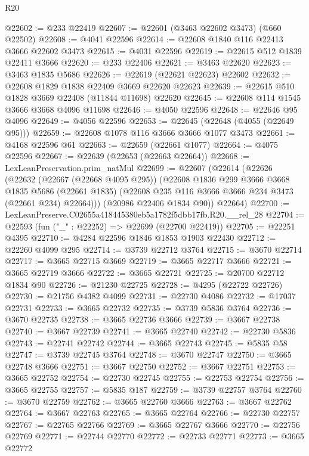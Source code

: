 \begin{lexlean}{R20}
\begin{coremodule}
@22602 := @233 @22419
@22607 := @22601 (@3463 @22602 @3473) (@660 @22502)
@22608 := @4041 @22596
@22614 := @22608 @1840 @116 @22413 @3666 @22602 @3473
@22615 := @4031 @22596
@22619 := @22615 @512 @1839 @22411 @3666
@22620 := @233 @22406
@22621 := @3463 @22620
@22623 := @3463 @1835 @5686
@22626 := @22619 (@22621 @22623) @22602
@22632 := @22608 @1829 @1838 @22409 @3669 @22620 @22623
@22639 := @22615 @510 @1828 @3669 @22408 (@11844 @11698) @22620
@22645 := @22608 @114 @1545 @3666 @3668 @4096 @11698
@22646 := @4050 @22596
@22648 := @22646 @95 @4096
@22649 := @4056 @22596
@22653 := @22645 (@22648 (@4055 (@22649 @95)))
@22659 := @22608 @1078 @116 @3666 @3666 @1077 @3473
@22661 := @4168 @22596 @61
@22663 := @22659 (@22661 @1077)
@22664 := @4075 @22596
@22667 := @22639 (@22653 (@22663 @22664))
@22668 := LexLeanPreservation.prim_natMul
@22699 := @22607
    (@22614
      (@22626
        (@22632
          (@22667 (@22668 @4095 @295))
          (@22608
            @1836
            @299
            @3666
            @3668
            @1835
            @5686
            (@22661 @1835)
            (@22608 @235 @116 @3666 @3666 @234 @3473 (@22661 @234) @22664)))
        (@20986 @22406 @1834 @90))
      @22664)
@22700 := LexLeanPreserve.C02655a418445380eb5a1782f5dbb17fb.R20.__rel_28
@22704 := @22593 (fun ("_" : @22252) => @22699 (@22700 @22419))
@22705 := @22251 @4395
@22710 := @4284 @22596 @1846 @1853 @1903 @22430
@22712 := @22260 @4099 @295
@22714 := @3739 @22712 @3764
@22715 := @3670 @22714
@22717 := @3665 @22715 @3669
@22719 := @3665 @22717 @3666
@22721 := @3665 @22719 @3666
@22722 := @3665 @22721
@22725 := @20700 @22712 @1834 @90
@22726 := @21230 @22725
@22728 := @4295 (@22722 @22726)
@22730 := @21756 @4382 @4099
@22731 := @22730 @4086
@22732 := @17037 @22731
@22733 := @3665 @22732
@22735 := @3739 @5836 @3764
@22736 := @3670 @22735
@22738 := @3665 @22736 @3666
@22739 := @3667 @22738
@22740 := @3667 @22739
@22741 := @3665 @22740
@22742 := @22730 @5836
@22743 := @22741 @22742
@22744 := @3665 @22743
@22745 := @5835 @58
@22747 := @3739 @22745 @3764
@22748 := @3670 @22747
@22750 := @3665 @22748 @3666
@22751 := @3667 @22750
@22752 := @3667 @22751
@22753 := @3665 @22752
@22754 := @22730 @22745
@22755 := @22753 @22754
@22756 := @3665 @22755
@22757 := @5835 @187
@22759 := @3739 @22757 @3764
@22760 := @3670 @22759
@22762 := @3665 @22760 @3666
@22763 := @3667 @22762
@22764 := @3667 @22763
@22765 := @3665 @22764
@22766 := @22730 @22757
@22767 := @22765 @22766
@22769 := @3665 @22767 @3666
@22770 := @22756 @22769
@22771 := @22744 @22770
@22772 := @22733 @22771
@22773 := @3665 @22772

\end{coremodule}
\end{lexlean}
